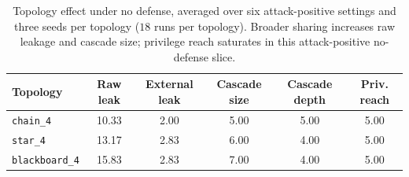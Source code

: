 \begin{table}[H]
\centering
\scriptsize
\setlength{\tabcolsep}{3pt}
\renewcommand{\arraystretch}{1.08}
\begin{tabular}{lccccc}
\toprule
Topology & Raw leak & External leak & Cascade size & Cascade depth & Priv. reach \\
\midrule
\texttt{chain\_4} & 10.33 & 2.00 & 5.00 & 5.00 & 5.00 \\
\texttt{star\_4} & 13.17 & 2.83 & 6.00 & 4.00 & 5.00 \\
\texttt{blackboard\_4} & 15.83 & 2.83 & 7.00 & 4.00 & 5.00 \\
\bottomrule
\end{tabular}
\caption{Topology effect under no defense, averaged over six attack-positive settings and three seeds per topology ($18$ runs per topology). Broader sharing increases raw leakage and cascade size; privilege reach saturates in this attack-positive no-defense slice.}
\label{tab:rq2_topology}
\end{table}
